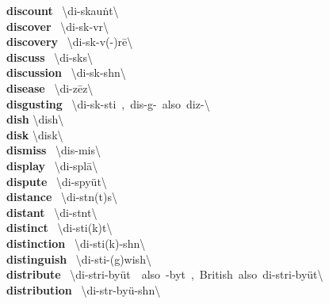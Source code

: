 \documentclass[10pt,a4paper]{article}
\begin{document}
\begin{multicols}{2}
\textbf{ discount }\quad \ \textbackslash \textprimstress di-\textsecstress skau\. nt\textbackslash \\
\textbf{ discover }\quad \ \textbackslash di-\textprimstress sk\textschwa -v\textschwa r\textbackslash \\
\textbf{ discovery }\quad \ \textbackslash di-\textprimstress sk\textschwa -v(\textschwa -)r\={e}\textbackslash \\
\textbf{ discuss }\quad \ \textbackslash di-\textprimstress sk\textschwa s\textbackslash \\
\textbf{ discussion }\quad \ \textbackslash di-\textprimstress sk\textschwa -sh\textschwa n\textbackslash \\
\textbf{ disease }\quad \ \textbackslash di-\textprimstress z\={e}z\textbackslash \\
\textbf{ disgusting }\quad \ \textbackslash di-\textprimstress sk\textschwa -sti\engma \ ,\ dis-\textprimstress g\textschwa -\ also\ diz-\textbackslash \\
\textbf{ dish }\quad \textbackslash \textprimstress dish\textbackslash \\
\textbf{ disk }\quad \textbackslash \textprimstress disk\textbackslash \\
\textbf{ dismiss }\quad \ \textbackslash dis-\textprimstress mis\textbackslash \\
\textbf{ display }\quad \ \textbackslash di-\textprimstress spl\={a}\textbackslash \\
\textbf{ dispute }\quad \ \textbackslash di-\textprimstress spy\"{u}t\textbackslash \\
\textbf{ distance }\quad \ \textbackslash \textprimstress di-st\textschwa n(t)s\textbackslash \\
\textbf{ distant }\quad \ \textbackslash \textprimstress di-st\textschwa nt\textbackslash \\
\textbf{ distinct }\quad \ \textbackslash di-\textprimstress sti\engma (k)t\textbackslash \\
\textbf{ distinction }\quad \ \textbackslash di-\textprimstress sti\engma (k)-sh\textschwa n\textbackslash \\
\textbf{ distinguish }\quad \ \textbackslash di-\textprimstress sti\engma -(g)wish\textbackslash \\
\textbf{ distribute }\quad \ \textbackslash di-\textprimstress stri-by\"{u}t\ \ also\ -by\textschwa t\ ,\ British\ also\ \textprimstress di-stri-\textsecstress by\"{u}t\textbackslash \\
\textbf{ distribution }\quad \ \textbackslash \textsecstress di-str\textschwa -\textprimstress by\"{u}-sh\textschwa n\textbackslash \\

\end{multicols}
\end{document}
